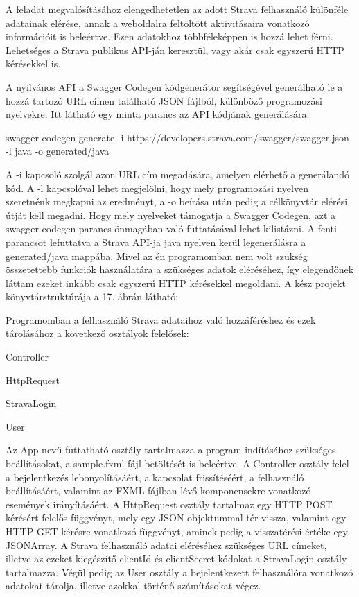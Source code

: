 A feladat megvalósításához elengedhetetlen az adott Strava felhasználó különféle adatainak elérése, annak a weboldalra feltöltött aktivitásaira vonatkozó információit is beleértve. Ezen adatokhoz többféleképpen is hozzá lehet férni. Lehetséges a Strava publikus API-ján keresztül, vagy akár csak egyszerű HTTP kérésekkel is. 

A nyilvános API a Swagger Codegen kódgenerátor segítségével generálható le a hozzá tartozó URL címen található JSON fájlból, különböző programozási nyelvekre. Itt látható egy minta parancs az API kódjának generálására: 

swagger-codegen generate -i https://developers.strava.com/swagger/swagger.json -l java -o generated/java 


A -i kapcsoló szolgál azon URL cím megadására, amelyen elérhető a generálandó kód. A -l kapcsolóval lehet megjelölni, hogy mely programozási nyelven szeretnénk megkapni az eredményt, a -o beírása után pedig a célkönyvtár elérési útját kell megadni. Hogy mely nyelveket támogatja a Swagger Codegen, azt a swagger-codegen parancs önmagában való futtatásával lehet kilistázni. A fenti parancsot lefuttatva a Strava API-ja java nyelven kerül legenerálásra a generated/java mappába. Mivel az én programomban nem volt szükség összetettebb funkciók használatára a szükséges adatok eléréséhez, így elegendőnek láttam ezeket inkább csak egyszerű HTTP kérésekkel megoldani. A kész projekt könyvtárstruktúrája a 17. ábrán látható: 


Programomban a felhasználó Strava adataihoz való hozzáféréshez és ezek tárolásához a következő osztályok felelősek: 

Controller 

HttpRequest 

StravaLogin 

User 

Az App nevű futtatható osztály tartalmazza a program indításához szükséges beállításokat, a sample.fxml fájl betöltését is beleértve. A Controller osztály felel a bejelentkezés lebonyolításáért, a kapcsolat frissítéséért, a felhasználó beállításáért, valamint az FXML fájlban lévő komponensekre vonatkozó események irányításáért. A HttpRequest osztály tartalmaz egy HTTP POST kérésért felelős függvényt, mely egy JSON objektummal tér vissza, valamint egy HTTP GET kérésre vonatkozó függvényt, aminek pedig a visszatérési értéke egy JSONArray. A Strava felhasználó adatai eléréséhez szükséges URL címeket, illetve az ezeket kiegészítő clientId és clientSecret kódokat a StravaLogin osztály tartalmazza. Végül pedig az User osztály a bejelentkezett felhasználóra vonatkozó adatokat tárolja, illetve azokkal történő számításokat végez. 

